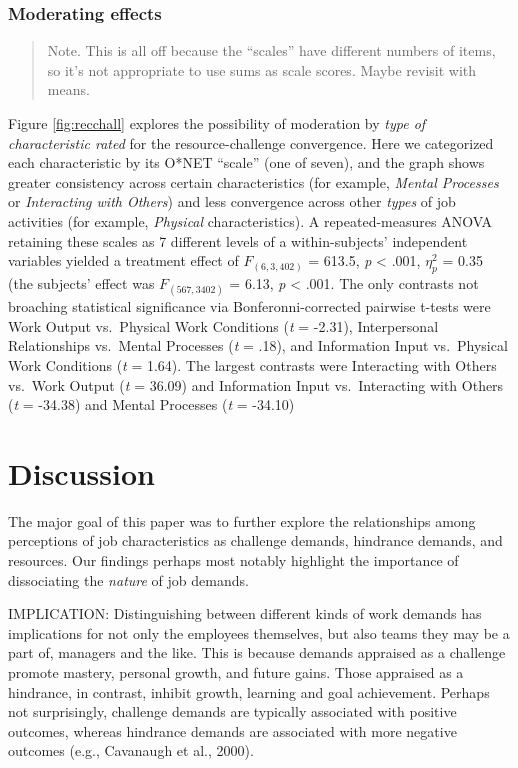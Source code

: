 \documentclass[
  man]{apa6}
\begin{document}
\hypertarget{moderating-effects}{%
\subsubsection{Moderating effects}\label{moderating-effects}}

\begin{quote}
Note. This is all off because the ``scales'' have different numbers of items, so it's not appropriate to use sums as scale scores. Maybe revisit with means.
\end{quote}

Figure \ref{fig:recchall} explores the possibility of moderation by \emph{type of characteristic rated} for the resource-challenge convergence. Here we categorized each characteristic by its O*NET ``scale'' (one of seven), and the graph shows greater consistency across certain characteristics (for example, \emph{Mental Processes} or \emph{Interacting with Others}) and less convergence across other \emph{types} of job activities (for example, \emph{Physical} characteristics). A repeated-measures ANOVA retaining these scales as 7 different levels of a within-subjects' independent variables yielded a treatment effect of \(F_{(6, 3,402)}\) = 613.5, \emph{p} \textless{} .001, \(\eta^2_{p}\) = 0.35 (the subjects' effect was \(F_{(567, 3402)}\) = 6.13, \emph{p} \textless{} .001. The only contrasts not broaching statistical significance via Bonferonni-corrected pairwise t-tests were Work Output vs.~Physical Work Conditions (\emph{t} = -2.31), Interpersonal Relationships vs.~Mental Processes (\emph{t} = .18), and Information Input vs.~Physical Work Conditions (\emph{t} = 1.64). The largest contrasts were Interacting with Others vs.~Work Output (\emph{t} = 36.09) and Information Input vs.~Interacting with Others (\emph{t} = -34.38) and Mental Processes (\emph{t} = -34.10)

\hypertarget{discussion}{%
\section{Discussion}\label{discussion}}

The major goal of this paper was to further explore the relationships among perceptions of job characteristics as challenge demands, hindrance demands, and resources. Our findings perhaps most notably highlight the importance of dissociating the \emph{nature} of job demands.

IMPLICATION: Distinguishing between different kinds of work demands has implications for not only the employees themselves, but also teams they may be a part of, managers and the like. This is because demands appraised as a challenge promote mastery, personal growth, and future gains. Those appraised as a hindrance, in contrast, inhibit growth, learning and goal achievement. Perhaps not surprisingly, challenge demands are typically associated with positive outcomes, whereas hindrance demands are associated with more negative outcomes (e.g., Cavanaugh et al., 2000).
\end{document}
